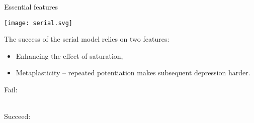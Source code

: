 \documentclass{beamer}%
\begin{document}
\begin{frame}{Essential features}
%
 \begin{center}
   \texttt{[image: serial.svg]}
 \end{center}
 \vp The success of the serial model relies on two features:
 \begin{itemize}
   \item Enhancing the effect of saturation,
   \item Metaplasticity -- repeated potentiation makes subsequent depression harder.
 \end{itemize}
 
 \vp 
 \begin{center}
 \parbox[t]{0.3\linewidth}{\centering
    Fail:\\
    \vp{}\\
    \vp{} 
 }
 \hp
 \parbox[t]{0.3\linewidth}{\centering
    Succeed:\\
    \vp{}\\
    \vp{}
 }
 \end{center}
%
\end{frame}
\end{document}
